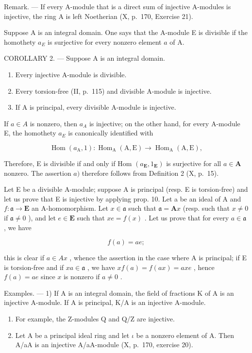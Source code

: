 Remark. --- If every A-module that is a direct sum of injective A-modules is injective, the ring A is left Noetherian (X, p.~170, Exercise 21).

Suppose A is an integral domain. One says that the A-module E is divisible if the homothety \(a_{E}\) is surjective for every nonzero element \(a\) of A.

COROLLARY 2. --- Suppose A is an integral domain.

\begin{enumerate}
\def\labelenumi{\alph{enumi})}
\item
  Every injective A-module is divisible.
\item
  Every torsion-free (II, p.~115) and divisible A-module is injective.
\item
  If A is principal, every divisible A-module is injective.
\end{enumerate}

If \(a \in A\) is nonzero, then \(a_{A}\) is injective; on the other hand, for every A-module E, the homothety \(a_{E}\) is canonically identified with

\[
\operatorname{Hom} \left(a _ {\mathrm{A}}, 1\right): \operatorname{Hom} _ {\mathrm{A}} (\mathrm{A}, \mathrm{E}) \rightarrow \operatorname{Hom} _ {\mathrm{A}} (\mathrm{A}, \mathrm{E}),
\]

Therefore, E is divisible if and only if Hom \((a_{\mathbf{E}}, 1_{\mathbf{E}})\) is surjective for all \(a \in \mathbf{A}\) nonzero. The assertion \(a)\) therefore follows from Definition 2 (X, p.~15).

Let E be a divisible A-module; suppose A is principal (resp. E is torsion-free) and let us prove that E is injective by applying prop. 10. Let a be an ideal of A and \(f: \mathfrak{a} \to \mathbf{E}\) an A-homomorphism. Let \(x \in \mathfrak{a}\) such that \(\mathfrak{a} = \mathbf{A}x\) (resp. such that \(x \neq 0\) if \(\mathfrak{a} \neq 0\) ), and let \(e \in \mathbf{E}\) such that \(xe = f(x)\) . Let us prove that for every \(a \in \mathfrak{a}\) , we have

\[
f (a) = a e;
\]

this is clear if \(a \in Ax\) , whence the assertion in the case where A is principal; if E is torsion-free and if \(xa \in \mathfrak{a}\) , we have \(xf(a) = f(ax) = axe\) , hence \(f(a) = ae\) since \(x\) is nonzero if \(a \neq 0\) .

Examples. --- 1) If A is an integral domain, the field of fractions K of A is an injective A-module. If A is principal, K/A is an injective A-module.

\begin{enumerate}
\def\labelenumi{\arabic{enumi})}
\setcounter{enumi}{1}
\item
  For example, the Z-modules Q and Q/Z are injective.
\item
  Let A be a principal ideal ring and let \(\iota\) be a nonzero element of A. Then A/aA is an injective A/aA-module (X, p.~170, exercise 20).
\end{enumerate}

